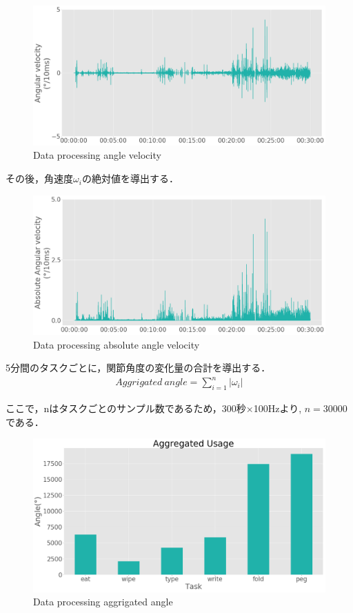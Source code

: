 \begin{figure}[H]
  \centering
  \includegraphics[width=0.8\linewidth]{fig/v}
  \caption{Data processing angle velocity}
  \label{fig:angle_velocity}
\end{figure}

その後，角速度$\omega_i$の絶対値を導出する．

\begin{figure}[H]
  \centering
  \includegraphics[width=0.8\linewidth]{fig/absolute_v}
  \caption{Data processing absolute angle velocity}
  \label{fig:abs_velocity}
\end{figure}

5分間のタスクごとに，関節角度の変化量の合計を導出する．
\begin{eqnarray}
Aggrigated\ angle  = \sum_{i=1}^n |\omega_i|
\end{eqnarray}

ここで，nはタスクごとのサンプル数であるため，300秒$\times$100Hzより,
$n=30000$である．

\begin{figure}[H]
  \centering
  \includegraphics[width=0.8\linewidth]{fig/aggrigated_angle}
  \caption{Data processing aggrigated angle}
  \label{fig:accel_xyz}
\end{figure}




